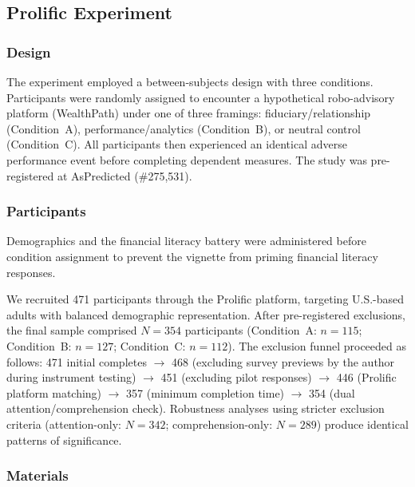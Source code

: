 \subsection{Prolific Experiment}
\label{sec:methods_prolific}

\subsubsection{Design}
\label{sec:methods_design}

The experiment employed a between-subjects design with three conditions. Participants were randomly assigned to encounter a hypothetical robo-advisory platform (WealthPath) under one of three framings: fiduciary/\allowbreak relationship (Condition~A), performance/\allowbreak analytics (Condition~B), or neutral control (Condition~C). All participants then experienced an identical adverse performance event before completing dependent measures. The study was pre-registered at AsPredicted (\#275,531).

\subsubsection{Participants}
\label{sec:methods_participants}

Demographics and the financial literacy battery were administered before condition assignment to prevent the vignette from priming financial literacy responses.

We recruited 471 participants through the Prolific platform, targeting U.S.-based adults with balanced demographic representation. After pre-registered exclusions, the final sample comprised $N = 354$ participants (Condition~A: $n = 115$; Condition~B: $n = 127$; Condition~C: $n = 112$). The exclusion funnel proceeded as follows: 471 initial completes $\to$ 468 (excluding survey previews by the author during instrument testing) $\to$ 451 (excluding pilot responses) $\to$ 446 (Prolific platform matching) $\to$ 357 (minimum completion time) $\to$ 354 (dual attention/comprehension check). Robustness analyses using stricter exclusion criteria (attention-only: $N = 342$; comprehension-only: $N = 289$) produce identical patterns of significance.

\subsubsection{Materials}
\label{sec:methods_materials}

